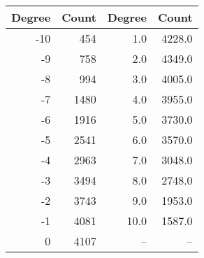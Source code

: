 \begin{tabular}{rrrr}
\toprule
 Degree &  Count &  Degree &  Count \\
\midrule
    -10 &    454 &       1.0 &   4228.0 \\
     -9 &    758 &       2.0 &   4349.0 \\
     -8 &    994 &       3.0 &   4005.0 \\
     -7 &   1480 &       4.0 &   3955.0 \\
     -6 &   1916 &       5.0 &   3730.0 \\
     -5 &   2541 &       6.0 &   3570.0 \\
     -4 &   2963 &       7.0 &   3048.0 \\
     -3 &   3494 &       8.0 &   2748.0 \\
     -2 &   3743 &       9.0 &   1953.0 \\
     -1 &   4081 &      10.0 &   1587.0 \\
      0 &   4107 &       -- &      -- \\
\bottomrule
\end{tabular}
